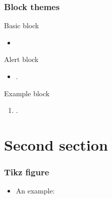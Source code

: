 \documentclass[11pt]{beamer}
\begin{document}
\begin{frame}[t, label=blocktheme]
\frametitle{Block themes}

    \begin{block}{Basic block}
        \begin{itemize}
            \item \lipsum[1][1-2]
        \end{itemize}
    \end{block}
    
    \begin{alertblock}{Alert block}
        \begin{itemize}
            \item \lipsum[1][1-1]\cite{belghazi2018mutual}.
        \end{itemize}
    \end{alertblock}

    \begin{exampleblock}{Example block}
        \begin{enumerate}
            \item \lipsum[1][1-3]\cite{berisha2014empirical}.
        \end{enumerate}
    \end{exampleblock}
\end{frame}

\section{Second section}

\begin{frame}[t, label=tikzfigure]
\frametitle{Tikz figure}
    \begin{itemize}
        \item An example:
    \end{itemize}
    
    \begin{center}
        
    \end{center}
\end{frame}
\end{document}
